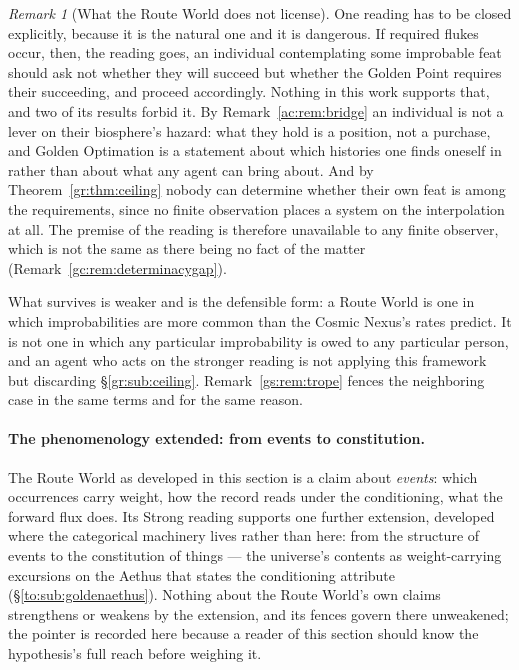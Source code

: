 \documentclass[11pt]{article}
\numberwithin{equation}{section}
\theoremstyle{plain}
\theoremstyle{definition}
\theoremstyle{remark}
\newtheorem{remark}[theorem]{Remark}
\begin{document}
\begin{remark}[What the Route World does not license]
\label{gc:rem:routefence}
One reading has to be closed explicitly, because it is the natural one
and it is dangerous. If required flukes occur, then, the reading goes, an individual
contemplating some improbable feat should ask not whether they will
succeed but whether the Golden Point requires their succeeding, and
proceed accordingly. Nothing in this work supports that, and two of its
results forbid it. By Remark~\ref{ac:rem:bridge} an individual is not a
lever on their biosphere's hazard: what they hold is a position, not a
purchase, and Golden Optimation is a statement about which histories one
finds oneself in rather than about what any agent can bring about. And
by Theorem~\ref{gr:thm:ceiling} nobody can determine whether their own
feat is among the requirements, since no finite observation places a
system on the interpolation at all. The premise of the reading is therefore
unavailable to any finite observer, which is not the same as there being
no fact of the matter (Remark~\ref{gc:rem:determinacygap}).

What survives is weaker and is the defensible form: a Route World is one in
which improbabilities are more common than the Cosmic Nexus's rates
predict. It is not one in which any particular improbability is owed to
any particular person, and an agent who acts on the stronger reading is
not applying this framework but discarding
\S\ref{gr:sub:ceiling}. Remark~\ref{gs:rem:trope} fences the neighboring
case in the same terms and for the same reason.
\end{remark}

\paragraph{The phenomenology extended: from events to constitution.}\label{gc:rem:constitution}
The Route World as developed in this section is a claim about
\emph{events}: which occurrences carry weight, how the record reads
under the conditioning, what the forward flux does. Its Strong reading
supports one further extension, developed where the categorical
machinery lives rather than here: from the structure of events to the
constitution of things --- the universe's contents as
weight-carrying excursions on the Aethus that states the conditioning
attribute (\S\ref{to:sub:goldenaethus}). Nothing about the Route
World's own claims strengthens or weakens by the extension, and its
fences govern there unweakened; the pointer is recorded here because a
reader of this section should know the hypothesis's full reach before
weighing it.
\end{document}
